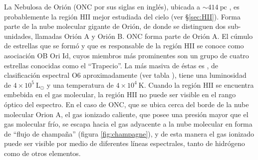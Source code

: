 La Nebulosa de Orión (ONC por sus siglas en inglés), ubicada a $\sim 414\mathrm{~pc}$ \citep{Menten:2007}, es probablemente la región HII mejor estudiada del cielo (ver \S \ref{sec:HII}). Forma parte de la nube molecular gigante de Orión, de donde se distinguen dos sub-unidades, llamadas Orión A y Orión B. ONC forma parte de Orión A. El cúmulo de estrellas que se formó y que es responsable de la región HII se conoce como asociación OB Ori Id, cuyos miembros más prominentes son un grupo de cuatro estrellas conocidas como el ``Trapecio''. La más masiva de éstas es \thC{}, de clasificación espectral O6 aproximadamente (ver tabla ), tiene una luminosidad de $4 \times 10^5 \mathrm{~L_\odot}$ y una temperatura de $4\times 10^4\mathrm{~K}$. Cuando la región HII se encuentra embebida en el gas molecular, la región HII no puede ser visible en el rango óptico del espectro.  En el caso de ONC, que se ubica cerca del borde de la nube molecular Orion A, el gas ionizado caliente, que posee una presión mayor que el gas molecular frío, se escapa hacia el gas adyacente a la nube molecular en forma de ``flujo de champaña'' (figura \ref{fig:champagne}), y de esta manera el gas ionizado puede ser visible por medio de diferentes líneas espectrales, tanto de hidrógeno como de otros elementos. 

